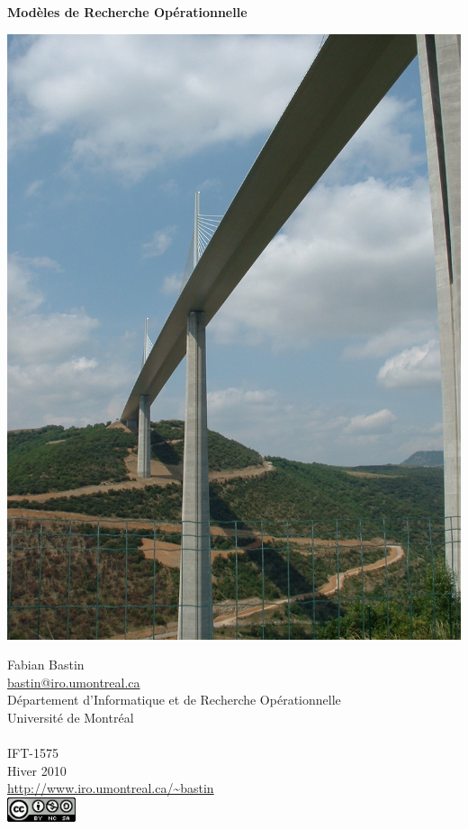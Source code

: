\documentclass[11pt]{book}%
\theoremstyle{plain}
\numberwithin{equation}{section}
\begin{document}
\shorthandoff{:}

\frontmatter

\thispagestyle{empty}

\begin{center}
{\Huge \bf \sc Modèles de Recherche Opérationnelle}

\mbox{}

\includegraphics[width=0.7\linewidth]{dscf0035.jpg}
		
\mbox{}

{\Large Fabian Bastin}\\
{\normalsize \url{bastin@iro.umontreal.ca}}
\mbox{}\\Département d'Informatique et de Recherche Opérationnelle\\
Université de Montréal\\\mbox{}\\
IFT-1575\\
Hiver 2010\\
\url{http://www.iro.umontreal.ca/~bastin}\\
\includegraphics[width=2cm]{cc.png}
\end{center}

\pagebreak{}

\thispagestyle{empty}
\end{document}
